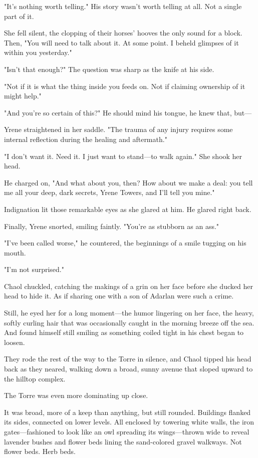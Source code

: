 "It's nothing worth telling."
His story wasn't worth telling at all.
Not a single part of it.

She fell silent, the clopping of their horses' hooves the only sound for a block.
Then, "You will need to talk about it.
At some point.
I  beheld glimpses of it within you yesterday."

"Isn't that enough?"
The question was sharp as the knife at his side.

"Not if it is what the thing inside you feeds on.
Not if claiming ownership of it might help."

"And you're so certain of this?"
He should mind his tongue, he knew that, but---

Yrene straightened in her saddle.
"The trauma of any injury requires some internal reflection during the healing and aftermath."

"I don't want it.
Need it.
I just want to stand---to walk again."
She shook her head.

He charged on, "And what about you, then?
How about we make a deal: you tell me all your deep, dark secrets, Yrene Towers, and I'll tell you mine."

Indignation lit those remarkable eyes as she glared at him.
He glared right back.

Finally, Yrene snorted, smiling faintly.
"You're as stubborn as an ass."

"I've been called worse," he countered, the beginnings of a smile tugging on his mouth.

"I'm not surprised."

Chaol chuckled, catching the makings of a grin on her face before she ducked her head to hide it.
As if sharing one with a son of Adarlan were such a crime.

Still, he eyed her for a long moment---the humor lingering on her face, the heavy, softly curling hair that was occasionally caught in the morning breeze off the sea.
And found himself still smiling as something coiled tight in his chest began to loosen.

They rode the rest of the way to the Torre in silence, and Chaol tipped his head back as they neared, walking down a broad, sunny avenue that sloped upward to the hilltop complex.

The Torre was even more dominating up close.

It was broad, more of a keep than anything, but still rounded.
Buildings flanked its sides, connected on lower levels.
All enclosed by towering white walls, the iron gates---fashioned to look like an owl spreading its wings---thrown wide to reveal lavender bushes and flower beds lining the sand-colored gravel walkways.
Not flower beds.
Herb beds.

